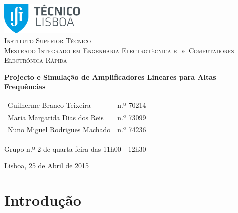 \documentclass[11pt]{article}
\numberwithin{equation}{section}
\begin{document}
\begin{titlepage}
\begin{center}

\hfill \break
\hfill \break

\includegraphics[width=0.3\textwidth]{./logo}~\\[1cm] 

\textsc{\LARGE Instituto Superior Técnico}\\[0.25cm]
\textsc{\Large Mestrado Integrado em Engenharia Electrotécnica e de Computadores}\\[1.8cm]
\textsc{\huge Electrónica Rápida}\\[0.25cm]

\vspace{6mm}

{\huge \bfseries Projecto e Simulação de Amplificadores Lineares para Altas Frequências\\[1cm]}

\begin{tabular}{ l l }
Guilherme Branco Teixeira & \hspace{2mm} n.º 70214 \\
Maria Margarida Dias dos Reis & \hspace{2mm} n.º 73099 \\
Nuno Miguel Rodrigues Machado & \hspace{2mm} n.º 74236
\end{tabular}

\vspace{7mm}

Grupo n.º 2 de quarta-feira das 11h00 - 12h30

\vfill

{\large Lisboa, 25 de Abril de 2015} 

\end{center}
\end{titlepage}

\clearpage

\tableofcontents
\pagebreak

\clearpage
{}

\section{Introdução}
\end{document}
